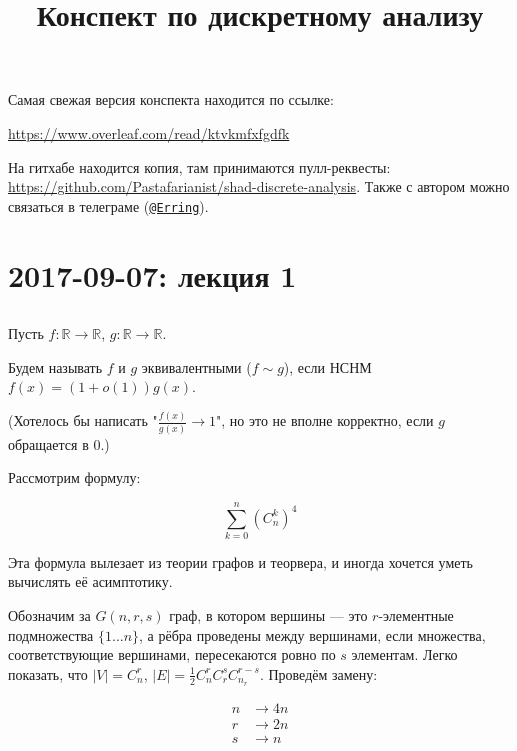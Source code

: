 \documentclass[12pt]{article}
\title{Конспект по дискретному анализу}
\begin{document}
\maketitle

Самая свежая версия конспекта находится по ссылке:

\begin{center}
\href{https://www.overleaf.com/read/ktvkmfxfgdfk}{https://www.overleaf.com/read/ktvkmfxfgdfk}
\end{center}

На гитхабе находится копия, там принимаются пулл-реквесты: \href{https://github.com/Pastafarianist/shad-discrete-analysis}{https://github.com/Pastafarianist/shad-discrete-analysis}. Также с автором можно связаться в телеграме (\href{https://t.me/Erring}{\texttt{@Erring}}).

\section{2017-09-07: лекция 1}

\subsection{}

Пусть $f \colon \mathbb R \to \mathbb R$, $g \colon \mathbb R \to \mathbb R$.

Будем называть $f$ и $g$ эквивалентными ($f \sim g$), если НСНМ $f(x) = (1 + o(1)) g(x)$.

(Хотелось бы написать "$\frac {f(x)} {g(x)} \to 1$", но это не вполне корректно, если $g$ обращается в $0$.)

Рассмотрим формулу:

\[
\sum_{k=0}^n \left( C^k_n \right)^4
\]

Эта формула вылезает из теории графов и теорвера, и иногда хочется уметь вычислять её асимптотику.

Обозначим за $G(n, r, s)$ граф, в котором вершины — это $r$-элементные подмножества $\{1 \ldots n\}$, а рёбра проведены между вершинами, если множества, соответствующие вершинами, пересекаются ровно по $s$ элементам. Легко показать, что $|V| = C^r_n$, $|E| = \frac 1 2 C^r_n  C^s_r C^{r - s}_{n_r}$. Проведём замену:

\begin{align*}
n &\to 4n \\
r &\to 2n \\
s &\to n
\end{align*}
\end{document}

